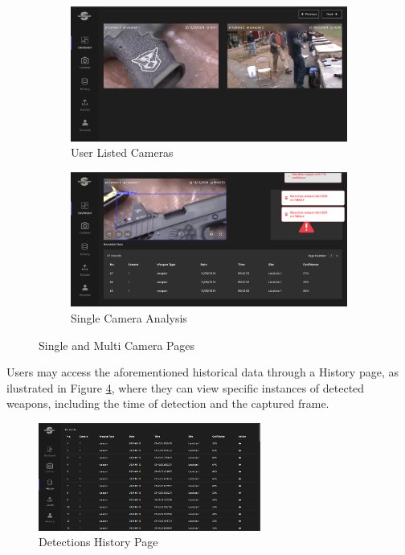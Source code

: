 \begin{figure}[h]
    \centering
    \begin{subfigure}[b]{0.49\textwidth}
        \centering
        \includegraphics[width=\linewidth]{figs/cameras-list.png}
        \caption{User Listed Cameras}
        \label{fig:camera-list}
    \end{subfigure}
    \hfill %
    \begin{subfigure}[b]{0.49\textwidth}
        \centering
        \includegraphics[width=\linewidth]{figs/camera-page.png}
        \caption{Single Camera Analysis}
        \label{fig:camera-page}
    \end{subfigure}
    \caption{Single and Multi Camera Pages}
    \label{fig:cameras-list-camera-analysis}
\end{figure}

Users may access the aforementioned historical data through a History page, as ilustrated 
in Figure \ref{fig:detections-history}, where 
they can view specific instances of detected weapons, including the time of detection and the captured frame.
\begin{figure}[h]
    \centering 
    \includegraphics[width=0.65\textwidth]{figs/history-page.png} 
    \caption{Detections History Page}
    \label{fig:detections-history}
\end{figure} 

